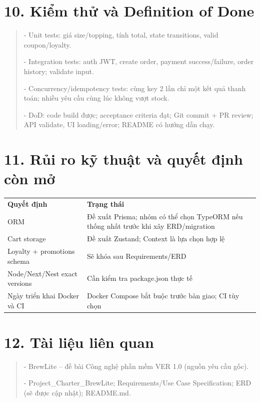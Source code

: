 \documentclass[11pt,a4paper,oneside]{report}
\begin{document}
\section{\texorpdfstring{\textbf{10. Kiểm thử và Definition of Done}}{10. Kiểm thử và Definition of Done}}\label{05-techstack:kiux1ec3m-thux1eed-vuxe0-definition-of-done}

\begin{quote}
- Unit tests: giá size/topping, tính total, state transitions, valid coupon/loyalty.

- Integration tests: auth JWT, create order, payment success/failure, order history; validate input.

- Concurrency/idempotency tests: cùng key 2 lần chỉ một kết quả thanh toán; nhiều yêu cầu cùng lúc không vượt stock.

- DoD: code build được; acceptance criteria đạt; Git commit + PR review; API validate, UI loading/error; README có hướng dẫn chạy.
\end{quote}

\section{\texorpdfstring{\textbf{11. Rủi ro kỹ thuật và quyết định còn mở}}{11. Rủi ro kỹ thuật và quyết định còn mở}}\label{05-techstack:rux1ee7i-ro-kux1ef9-thuux1eadt-vuxe0-quyux1ebft-ux111ux1ecbnh-cuxf2n-mux1edf}

\begin{longtable}[]{@{}
  >{\raggedright\arraybackslash}p{}
  >{\raggedright\arraybackslash}p{}@{}}
\toprule\noalign{}
\endhead
\bottomrule\noalign{}
\endlastfoot
\textbf{Quyết định} & \textbf{Trạng thái} \\
ORM & Đề xuất Prisma; nhóm có thể chọn TypeORM nếu thống nhất trước khi xây ERD/migration \\
Cart storage & Đề xuất Zustand; Context là lựa chọn hợp lệ \\
Loyalty + promotions schema & Sẽ khóa sau Requirements/ERD \\
Node/Next/Nest exact versions & Cần kiểm tra package.json thực tế \\
Ngày triển khai Docker và CI & Docker Compose bắt buộc trước bàn giao; CI tùy chọn \\
\end{longtable}

\section{\texorpdfstring{\textbf{12. Tài liệu liên quan}}{12. Tài liệu liên quan}}\label{05-techstack:tuxe0i-liux1ec7u-liuxean-quan}

\begin{quote}
- BrewLite -- đề bài Công nghệ phần mềm VER 1.0 (nguồn yêu cầu gốc).

- Project\_Charter\_BrewLite; Requirements/Use Case Specification; ERD (sẽ được cập nhật); README.md.
\end{quote}
\end{document}
